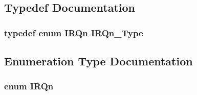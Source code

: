 \subsection{Typedef Documentation}
\hypertarget{a00468_ac3af4a32370fb28c4ade8bf2add80251}{
\subsubsection[{IRQn\_\-Type}]{\setlength{\rightskip}{0pt plus 5cm}typedef enum {\bf IRQn}  {\bf IRQn\_\-Type}}}
\label{a00468_ac3af4a32370fb28c4ade8bf2add80251}


\subsection{Enumeration Type Documentation}
\hypertarget{a00468_a666eb0caeb12ec0e281415592ae89083}{
\subsubsection[{IRQn}]{\setlength{\rightskip}{0pt plus 5cm}enum {\bf IRQn}}}
\label{a00468_a666eb0caeb12ec0e281415592ae89083}
